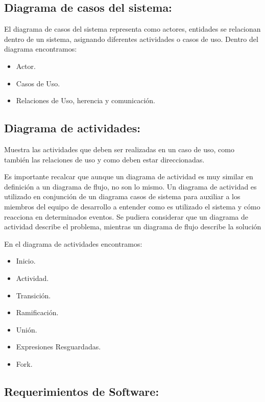 \documentclass[conference,compsoc,onecolumn]{IEEEtran}
\begin{document}
 
\subsection{Diagrama de casos del sistema:}


El diagrama de casos del sistema representa como actores, entidades se relacionan dentro de un sistema, asignando diferentes actividades o casos de uso. Dentro del diagrama encontramos: 

\begin{itemize}
    \item Actor.
    \item Casos de Uso.
    \item Relaciones de Uso, herencia y comunicación.
\end{itemize}

\subsection{Diagrama de actividades:}
Muestra las actividades que deben ser realizadas en un caso de uso, como también las relaciones de uso y como deben estar direccionadas.\newline

Es importante recalcar que aunque un diagrama de actividad es muy similar en definición a un diagrama de flujo, no son lo mismo. Un diagrama de actividad es utilizado en conjunción de un diagrama casos de sistema para auxiliar a los miembros del equipo de desarrollo a entender como es utilizado el sistema y cómo reacciona en determinados eventos. Se pudiera considerar que un diagrama de actividad describe el problema, mientras un diagrama de flujo describe la solución\newline

En el diagrama de actividades encontramos:

\begin{itemize}
    \item Inicio.
    \item Actividad.
    \item Transición.
    \item Ramificación.
    \item Unión.
    \item Expresiones Resguardadas.     
    \item Fork.
\end{itemize}

\subsection{Requerimientos de Software:}
\end{document}
